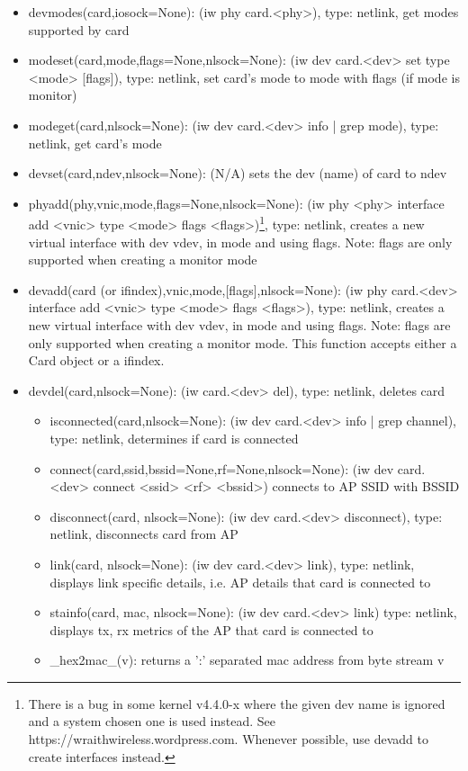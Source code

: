 \documentclass[11pt]{article}
\begin{document}
\begin{appendices}
\begin{itemize}
\item devmodes(card,iosock=None): (iw phy card.<phy>), type: netlink, get modes 
supported by card
\item modeset(card,mode,flags=None,nlsock=None): (iw dev card.<dev> set type <mode> 
[flags]), type: netlink, set card's mode to mode with flags (if mode is monitor)
\item modeget(card,nlsock=None): (iw dev card.<dev> info | grep mode), type: netlink,
get card's mode
\item devset(card,ndev,nlsock=None): (N/A) sets the dev (name) of card to ndev 
\item phyadd(phy,vnic,mode,flags=None,nlsock=None): (iw phy <phy> interface add <vnic>
type <mode> flags <flags>)\footnote{There is a bug in some kernel v4.4.0-x 
where the given dev name is ignored and a system chosen one is used instead. See 
https://wraithwireless.wordpress.com. Whenever possible, use devadd to create 
interfaces instead.}, type: netlink, creates a new virtual interface with dev vdev, 
in mode and using flags. Note: flags are only supported when creating a monitor mode
\item devadd(card (or ifindex),vnic,mode,[flags],nlsock=None): (iw phy card.<dev> 
interface add <vnic> type <mode> flags <flags>), type: netlink, creates a new virtual 
interface with dev vdev, in mode and using flags. Note: flags are only supported
when creating a monitor mode. This function accepts either a Card object or a 
ifindex.
\item devdel(card,nlsock=None): (iw card.<dev> del), type: netlink, deletes card
\begin{itemize}
\item isconnected(card,nlsock=None): (iw dev card.<dev> info | grep channel), type: 
netlink, determines if card is connected
\item connect(card,ssid,bssid=None,rf=None,nlsock=None): (iw dev card.<dev> connect <ssid>
<rf> <bssid>) connects to AP SSID with BSSID
\item disconnect(card, nlsock=None): (iw dev card.<dev> disconnect), type: netlink,
disconnects card from AP 
\item link(card, nlsock=None): (iw dev card.<dev> link), type: netlink, displays
link specific details, i.e. AP details that card is connected to
\item stainfo(card, mac, nlsock=None): (iw dev card.<dev> link) type: netlink, displays
tx, rx metrics of the AP that card is connected to
\item \_hex2mac\_(v): returns a ':' separated mac address from byte stream v

\end{itemize}
\end{itemize}
\end{appendices}
\end{document}
